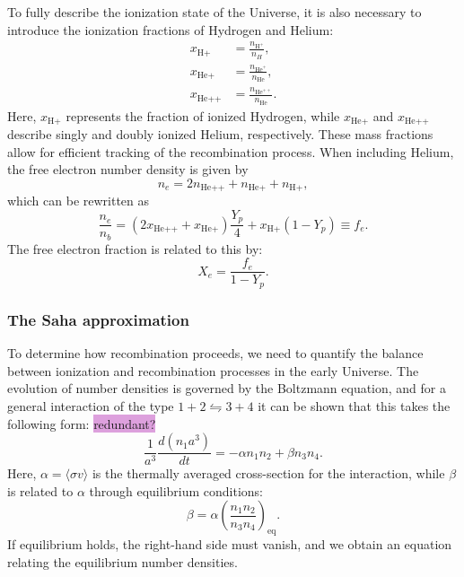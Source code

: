 \documentclass{aa}
\numberwithin{equation}{section}
\numberwithin{table}{section}
\numberwithin{figure}{section}
\begin{document}
To fully describe the ionization state of the Universe, it is also necessary to introduce the ionization fractions of Hydrogen and Helium:
\begin{align}
x_{\text{H+}} &= \frac{n_{\text{H}^+}}{n_H}, \\
x_{\text{He+}} &= \frac{n_{\text{He}^+}}{n_{\text{He}}}, \\
x_{\text{He++}} &= \frac{n_{\text{He}^{++}}}{n_{\text{He}}}.
\end{align}
Here, $x_{\text{H+}}$ represents the fraction of ionized Hydrogen, while $x_{\text{He+}}$ and $x_{\text{He++}}$ describe singly and doubly ionized Helium, respectively. These mass fractions allow for efficient tracking of the recombination process. When including Helium, the free electron number density is given by
\begin{equation}
n_e = 2n_{\text{He++}} + n_{\text{He+}} + n_{\text{H+}},
\end{equation}
which can be rewritten as
\begin{equation}
\frac{n_e}{n_b} = (2 x_{\text{He++}} + x_{\text{He+}}) \frac{Y_p}{4} + x_{\text{H+}} (1 - Y_p) \equiv f_e. \label{eq: fe}
\end{equation}
The free electron fraction is related to this by:
\begin{equation}
X_e = \frac{f_e}{1 - Y_p}.
\end{equation}








\subsubsection{The Saha approximation}\label{subsubsec: II theory Saha}
To determine how recombination proceeds, we need to quantify the balance between ionization and recombination processes in the early Universe. The evolution of number densities is governed by the Boltzmann equation, and for a general interaction of the type $1 + 2 \leftrightharpoons 3 + 4$ it can be shown that this takes the following form: \colorbox{Plum}{redundant?}
\begin{equation}
\frac{1}{a^3} \frac{d(n_1 a^3)}{dt} = -\alpha n_1 n_2 + \beta n_3 n_4. \label{eq: 1234}
\end{equation}
Here, $\alpha = \langle \sigma v \rangle$ is the thermally averaged cross-section for the interaction, while $\beta$ is related to $\alpha$ through equilibrium conditions:
\begin{equation}
\beta = \alpha \left( \frac{n_1 n_2}{n_3 n_4} \right)_{\text{eq}}. \label{eq: number densities}
\end{equation}
If equilibrium holds, the right-hand side must vanish, and we obtain an equation relating the equilibrium number densities.
\end{document}
